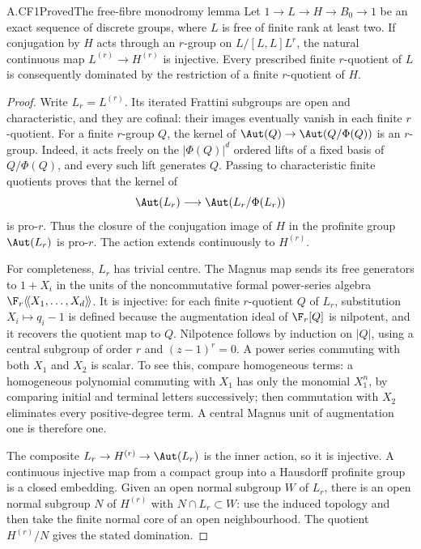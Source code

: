 \begin{claim}{A.CF1}{Proved}{The free-fibre monodromy lemma}
Let $1\to L\to H\to B_0\to1$ be an exact sequence of discrete groups,
where $L$ is free of finite rank at least two. If conjugation by $H$
acts through an $r$-group on $L/[L,L]L^r$, the natural continuous map
$L^{(r)}\to H^{(r)}$ is injective. Every prescribed finite $r$-quotient
of $L$ is consequently dominated by the restriction of a finite
$r$-quotient of $H$.
\end{claim}
\begin{proof}
Write $L_r=L^{(r)}$. Its iterated Frattini subgroups are open and
characteristic, and they are cofinal: their images eventually vanish in
each finite $r$-quotient. For a finite $r$-group $Q$, the kernel of
$\Aut(Q)\to\Aut(Q/\Phi(Q))$ is an $r$-group. Indeed, it acts freely
on the $|\Phi(Q)|^d$ ordered lifts of a fixed basis of $Q/\Phi(Q)$,
and every such lift generates $Q$. Passing to characteristic finite
quotients proves that the kernel of
\[
 \Aut(L_r)\longrightarrow\Aut(L_r/\Phi(L_r))
\]
is pro-$r$. Thus the closure of the conjugation image of $H$ in the
profinite group $\Aut(L_r)$ is pro-$r$. The action extends continuously
to $H^{(r)}$.

For completeness, $L_r$ has trivial centre. The Magnus map sends its
free generators to $1+X_i$ in the units of the noncommutative formal
power-series algebra $\F_r\langle\!\langle X_1,\ldots,X_d\rangle\!\rangle$.
It is injective: for each finite $r$-quotient $Q$ of $L_r$, substitution
$X_i\mapsto q_i-1$ is defined because the augmentation ideal of
$\F_r[Q]$ is nilpotent, and it recovers the quotient map to $Q$.
Nilpotence follows by induction on $|Q|$, using a central subgroup of
order $r$ and $(z-1)^r=0$. A power series commuting with both $X_1$
and $X_2$ is scalar. To see this, compare homogeneous terms: a
homogeneous polynomial commuting with $X_1$ has only the monomial
$X_1^n$, by comparing initial and terminal letters successively; then
commutation with $X_2$ eliminates every positive-degree term. A central
Magnus unit of augmentation one is therefore one.

The composite $L_r\to H^{(r)}\to\Aut(L_r)$ is the inner action,
so it is injective. A continuous injective map from a compact group
into a Hausdorff profinite group is a closed embedding. Given an open
normal subgroup $W$ of $L_r$, there is an open normal subgroup $N$ of
$H^{(r)}$ with $N\cap L_r\subset W$: use the induced topology and
then take the finite normal core of an open neighbourhood. The quotient
$H^{(r)}/N$ gives the stated domination.
\end{proof}

